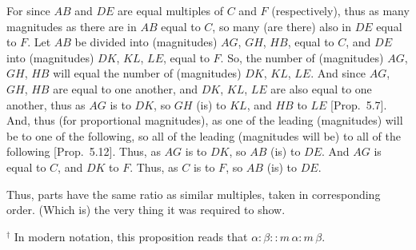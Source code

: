 \begin{Parallel}{}{}
{For since $AB$ and $DE$ are equal multiples of $C$ and $F$ (respectively), thus
as many magnitudes as there are in $AB$ equal to $C$, so many (are there) also
in $DE$ equal to $F$. Let $AB$ be divided into (magnitudes) $AG$, $GH$, $HB$, equal to $C$, and $DE$ into (magnitudes) $DK$, $KL$,  $LE$, equal to
$F$. So, the number of (magnitudes) $AG$, $GH$,  $HB$ will equal the number
of (magnitudes) $DK$, $KL$, $LE$.
And since $AG$, $GH$, $HB$ are equal to one another, 
and $DK$, $KL$,  $LE$ are also equal to one another,
thus as $AG$ is to
$DK$, so $GH$ (is) to $KL$, and $HB$ to $LE$ [Prop.~5.7]. And, thus (for proportional magnitudes), as one of the leading
(magnitudes) will be to one of the following, so all of the leading (magnitudes will be)
to all of the following [Prop.~5.12].
Thus, as $AG$ is to $DK$, so $AB$ (is) to $DE$. And $AG$ is equal to $C$, and 
$DK$ to $F$. Thus, as $C$ is to $F$, so $AB$ (is) to $DE$.

Thus, parts have the same ratio  as similar multiples,
taken in corresponding order. (Which is) the very thing it was required to
show.}
\end{Parallel}
{\footnotesize \noindent$^\dag$ In modern notation, this proposition
reads that $\alpha:\beta::m\,\alpha:m\,\beta$.}


